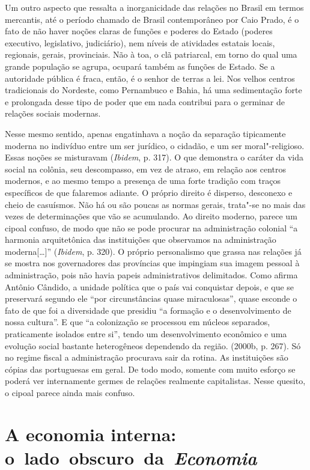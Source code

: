 Um outro aspecto que ressalta a inorganicidade das relações no Brasil em
termos mercantis, até o período chamado de Brasil contemporâneo por Caio
Prado, é o fato de não haver noções claras de funções e poderes do
Estado (poderes executivo, legislativo, judiciário), nem níveis de
atividades estatais locais, regionais, gerais, provinciais. Não à toa, o
clã patriarcal, em torno do qual uma grande população se agrupa, ocupará
também as funções de Estado. Se a autoridade pública é fraca, então, é o
senhor de terras a lei. Nos velhos centros tradicionais do Nordeste,
como Pernambuco e Bahia, há uma sedimentação forte e prolongada desse
tipo de poder que em nada contribui para o germinar de relações sociais
modernas.

Nesse mesmo sentido, apenas engatinhava a noção da separação tipicamente
moderna no indivíduo entre um ser jurídico, o cidadão, e um ser
moral"-religioso. Essas noções se misturavam (\emph{Ibidem}, p. 317). O
que demonstra o caráter da vida social na colônia, seu descompasso, em
vez de atraso, em relação aos centros modernos, e ao mesmo tempo a
presença de uma forte tradição com traços específicos de que falaremos
adiante. O próprio direito é disperso, desconexo e cheio de casuísmos.
Não há ou são poucas as normas gerais, trata"-se no mais das vezes de
determinações que vão se acumulando. Ao direito moderno, parece um
cipoal confuso, de modo que não se pode procurar na administração
colonial ``a harmonia arquitetônica das instituições que observamos na
administração moderna[\ldots{}]'' (\emph{Ibidem}, p. 320). O próprio
personalismo que grassa nas relações já se mostra nos governadores das
províncias que impingiam sua imagem pessoal à administração, pois não
havia papeis administrativos delimitados. Como afirma Antônio Cândido, a
unidade política que o país vai conquistar depois, e que se preservará
segundo ele ``por circunstâncias quase miraculosas'', quase esconde o
fato de que foi a diversidade que presidiu ``a formação e o
desenvolvimento de nossa cultura''. E que ``a colonização se processou
em núcleos separados, praticamente isolados entre si'', tendo um
desenvolvimento econômico e uma evolução social bastante heterogêneos
dependendo da região. (2000b, p. 267). Só no regime fiscal a
administração procurava sair da rotina. As instituições são cópias das
portuguesas em geral. De todo modo, somente com muito esforço se poderá ver
internamente germes de relações realmente capitalistas. Nesse quesito, o
cipoal parece ainda mais confuso.

\section{A economia interna: o~lado~obscuro~da~\emph{Economia}}


